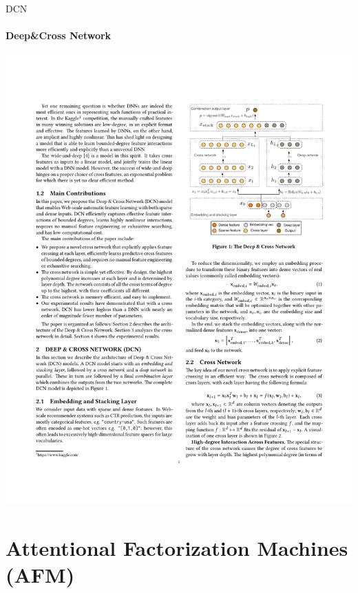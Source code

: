 \documentclass{ctexbeamer}
\begin{document}
\begin{frame}{DCN}
	\framesubtitle{Deep\&Cross Network }
	\begin{center}
		\includegraphics[width=.65\textwidth]{framework/dcn}
	\end{center}
\end{frame}

\section{Attentional Factorization Machines (AFM)}
\end{document}
